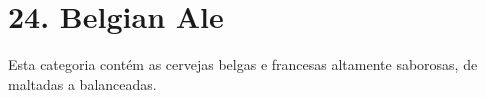\section*{24. Belgian Ale}

Esta categoria contém as cervejas belgas e francesas altamente saborosas, de maltadas a balanceadas.

